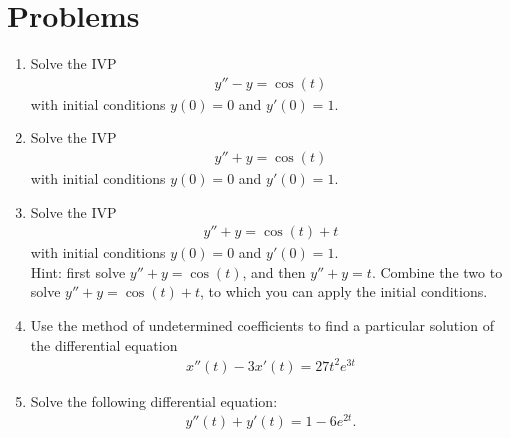 \documentclass{book}
\begin{document}
\section{Problems}

\begin{enumerate}

\item
  Solve the IVP
  \begin{align*}
  y'' - y = \cos(t)
  \end{align*}
  with initial conditions $y(0)=0$ and $y'(0)=1$.

\item
  Solve the IVP
  \begin{align*}
  y'' + y = \cos(t)
  \end{align*}
  with initial conditions $y(0)=0$ and $y'(0)=1$.

\item
  Solve the IVP
  \begin{align*}
    y'' + y = \cos(t) + t
  \end{align*}
  with initial conditions $y(0)=0$ and $y'(0)=1$.\\
  Hint: first solve $y'' + y = \cos(t)$, and then $y'' + y = t$. Combine
  the two to solve $y'' + y = \cos(t) + t$, to which you can apply the
  initial conditions.

\item
  Use the method of undetermined coefficients to find a particular solution of
  the differential equation
  \begin{align*}
    x''(t) - 3x'(t) = 27t^2e^{3t}
  \end{align*}

\item
  Solve the following differential equation:
  \begin{align*}
    y''(t) + y'(t) = 1 - 6 e^{2t}.
  \end{align*}

\end{enumerate}
\end{document}
